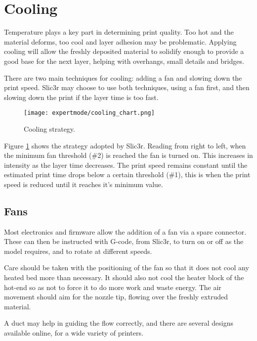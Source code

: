 
\section{Cooling} %
\label{sec:cooling}

Temperature plays a key part in determining print quality.  Too hot and the material deforms, too cool and layer adhesion may be problematic.  Applying cooling will allow the freshly deposited material to solidify enough to provide a good base for the next layer, helping with overhangs, small details and bridges.

There are two main techniques for cooling: adding a fan and slowing down the print speed.  Slic3r may choose to use both techniques, using a fan first, and then slowing down the print if the layer time is too fast.

\begin{figure}[H]
\centering
\texttt{[image: expertmode/cooling\_chart.png]}
\caption{Cooling strategy.}
\label{fig:cooling_chart}
\end{figure}

Figure \ref{fig:cooling_chart} shows the strategy adopted by Slic3r.  Reading from right to left, when the minimum fan threshold (\#2) is reached the fan is turned on.  This increases in intensity as the layer time decreases.  The print speed remains constant until the estimated print time drops below a certain threshold (\#1), this is when the print speed is reduced until it reaches it's minimum value.

\subsection{Fans} %
\label{sub:fans}
Most electronics and firmware allow the addition of a fan via a spare connector.  These can then be instructed with G-code, from Slic3r, to turn on or off as the model requires, and to rotate at different speeds.

Care should be taken with the positioning of the fan so that it does not cool any heated bed more than necessary.  It should also not cool the heater block of the hot-end so as not to force it to do more work and waste energy.  The air movement should aim for the nozzle tip, flowing over the freshly extruded material.

A duct may help in guiding the flow correctly, and there are several designs available online, for a wide variety of printers.

